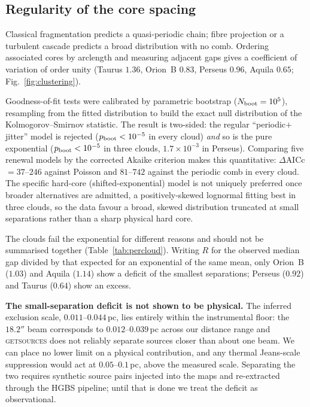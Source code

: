 \documentclass[usenatbib,twoside,twocolumn]{mnras}
\begin{document}
\subsection{Regularity of the core spacing}
\label{sec:clustering}

Classical fragmentation predicts a quasi-periodic chain; fibre projection or a turbulent cascade predicts a broad distribution with no comb. Ordering associated cores by arclength and measuring adjacent gaps gives a coefficient of variation of order unity (Taurus $1.36$, Orion~B $0.83$, Perseus $0.96$, Aquila $0.65$; Fig.~\ref{fig:clustering}).

Goodness-of-fit tests were calibrated by parametric bootstrap ($N_{\rm boot}=10^5$), resampling from the fitted distribution to build the exact null distribution of the Kolmogorov--Smirnov statistic. The result is two-sided: the regular ``periodic$+$jitter'' model is rejected ($p_{\rm boot}<10^{-5}$ in every cloud) \emph{and} so is the pure exponential ($p_{\rm boot}<10^{-5}$ in three clouds, $1.7\times10^{-3}$ in Perseus). Comparing five renewal models by the corrected Akaike criterion makes this quantitative: $\Delta$AICc$=37$--$246$ against Poisson and $81$--$742$ against the periodic comb in every cloud. The specific hard-core (shifted-exponential) model is not uniquely preferred once broader alternatives are admitted, a positively-skewed lognormal fitting best in three clouds, so the data favour a broad, skewed distribution truncated at small separations rather than a sharp physical hard core.

The clouds fail the exponential for different reasons and should not be summarised together (Table~\ref{tab:percloud}). Writing $R$ for the observed median gap divided by that expected for an exponential of the same mean, only Orion~B ($1.03$) and Aquila ($1.14$) show a deficit of the smallest separations; Perseus ($0.92$) and Taurus ($0.64$) show an excess.

\smallskip\noindent\textbf{The small-separation deficit is not shown to be physical.} The inferred exclusion scale, $0.011$--$0.044$\,pc, lies entirely within the instrumental floor: the $18.2''$ beam corresponds to $0.012$--$0.039$\,pc across our distance range and \textsc{getsources} does not reliably separate sources closer than about one beam. We can place no lower limit on a physical contribution, and any thermal Jeans-scale suppression would act at $0.05$--$0.1$\,pc, above the measured scale. Separating the two requires synthetic source pairs injected into the maps and re-extracted through the HGBS pipeline; until that is done we treat the deficit as observational.
\end{document}
